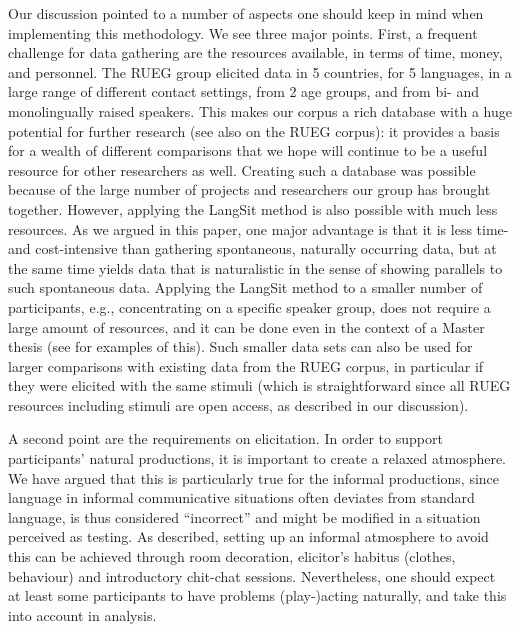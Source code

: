 \documentclass[output=paper,colorlinks,citecolor=brown]{langscibook}
\begin{document}
Our discussion pointed to a number of aspects one should keep in mind when implementing this methodology. We see three major points. First, a frequent challenge for data gathering are the resources available, in terms of time, money, and personnel. The RUEG group elicited data in 5 countries, for 5 languages, in a large range of different contact settings, from 2 age groups, and from bi- and monolingually raised speakers. This makes our corpus a rich database with a huge potential for further research (see also  on the RUEG corpus): it provides a basis for a wealth of different comparisons that we hope will continue to be a useful resource for other researchers as well. Creating such a database was possible because of the large number of projects and researchers our group has brought together. However, applying the LangSit method is also possible with much less resources. As we argued in this paper, one major advantage is that it is less time- and cost-intensive than gathering spontaneous, naturally occurring data, but at the same time yields data that is naturalistic in the sense of showing parallels to such spontaneous data. Applying the LangSit method to a smaller number of participants, e.g., concentrating on a specific speaker group, does not require a large amount of resources, and it can be done even in the context of a Master thesis (see \citealt{wiese2020} for examples of this). Such smaller data sets can also be used for larger comparisons with existing data from the RUEG corpus, in particular if they were elicited with the same stimuli (which is straightforward since all RUEG resources including stimuli are open access, as described in our discussion).

A second point are the requirements on elicitation. In order to support participants’ natural productions, it is important to create a relaxed atmosphere. We have argued that this is particularly true for the informal productions, since language in informal communicative situations often deviates from standard language, is thus considered “incorrect” and might be modified in a situation perceived as testing. As described, setting up an informal atmosphere to avoid this can be achieved through room decoration, elicitor’s habitus (clothes, behaviour) and introductory chit-chat sessions. Nevertheless, one should expect at least some participants to have problems (play-)acting naturally, and take this into account in analysis.
\end{document}
